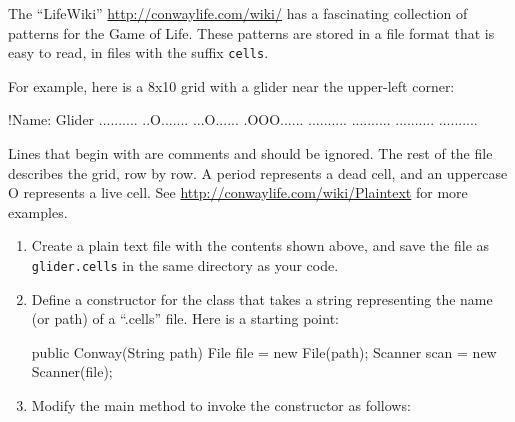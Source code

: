 

\begin{exercise}


The ``LifeWiki'' \url{http://conwaylife.com/wiki/} has a fascinating collection of patterns for the Game of Life.
These patterns are stored in a file format that is easy to read, in files with the suffix {\tt cells}.

For example, here is a 8x10 grid with a glider near the upper-left corner:

\begin{stdout}
!Name: Glider
..........
..O.......
...O......
.OOO......
..........
..........
..........
..........
\end{stdout}

Lines that begin with \java{!} are comments and should be ignored.
The rest of the file describes the grid, row by row.
A period represents a dead cell, and an uppercase O represents a live cell.
See \url{http://conwaylife.com/wiki/Plaintext} for more examples.

\begin{enumerate}

\item Create a plain text file with the contents shown above, and save the file as \verb|glider.cells| in the same directory as your code.


\item Define a constructor for the  class that takes a string representing the name (or path) of a ``.cells'' file.
Here is a starting point:

\begin{code}
public Conway(String path) {
    File file = new File(path);
    Scanner scan = new Scanner(file);
}
\end{code}

\item Modify the main method to invoke the constructor as follows:


\end{enumerate}
\end{exercise}
